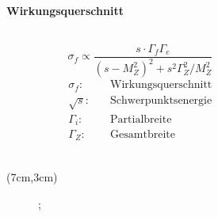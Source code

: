 \begin{iframe}
	\framesubtitle{Wirkungsquerschnitt}
	\begin{columns}
		\begin{column}{0.48\textwidth}
			\begin{equation*}
				\sigma_f \propto  \frac{s \cdot \Gamma_f \Gamma_e}{(s-M_Z^2)^2 + s^2\Gamma_Z^2/M_Z^2}
			\end{equation*}
			{\small
			\begin{align*}
			\sigma_f:& \quad \text{Wirkungsquerschnitt} \\
			\sqrt{s}:& \quad \text{Schwerpunktsenergie}\\
			\Gamma_i:& \quad \text{Partialbreite}\\
			\Gamma_Z:& \quad \text{Gesamtbreite}\\
		\end{align*}
			}
		\end{column}
		\begin{column}{0.48\textwidth}
		\end{column}
	\end {columns}
	\begin{textblock*}{5cm}(7cm,3cm) %
				\begin{figure}
				;
			\end{figure}
		\end{textblock*}
\end{iframe}

